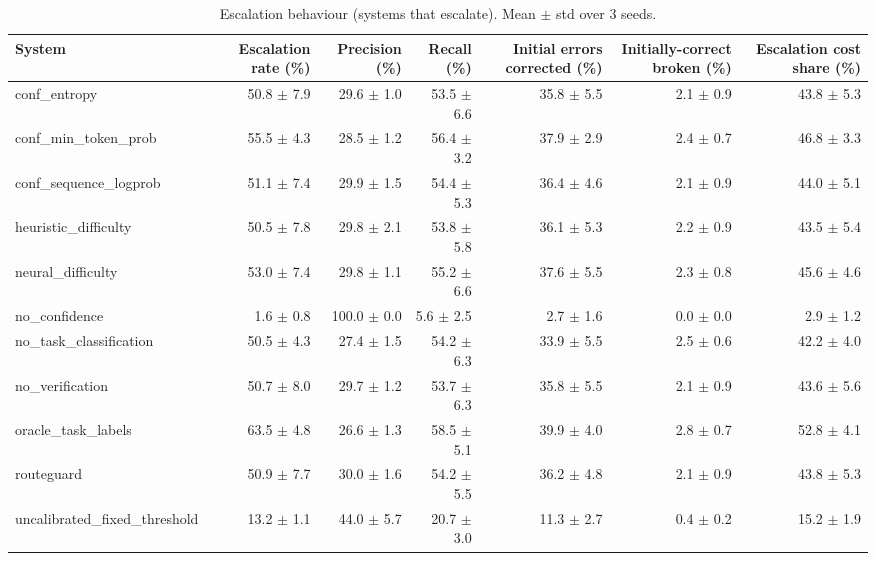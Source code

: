 \begin{table}[t]
\centering
\small
\caption{Escalation behaviour (systems that escalate). Mean $\pm$ std over 3 seeds.}
\label{tab:escalation}
\begin{tabular}{lrrrrrr}
\toprule
System & Escalation rate (\%) & Precision (\%) & Recall (\%) & Initial errors corrected (\%) & Initially-correct broken (\%) & Escalation cost share (\%) \\
\midrule
conf\_entropy & 50.8 $\pm$ 7.9 & 29.6 $\pm$ 1.0 & 53.5 $\pm$ 6.6 & 35.8 $\pm$ 5.5 & 2.1 $\pm$ 0.9 & 43.8 $\pm$ 5.3 \\
conf\_min\_token\_prob & 55.5 $\pm$ 4.3 & 28.5 $\pm$ 1.2 & 56.4 $\pm$ 3.2 & 37.9 $\pm$ 2.9 & 2.4 $\pm$ 0.7 & 46.8 $\pm$ 3.3 \\
conf\_sequence\_logprob & 51.1 $\pm$ 7.4 & 29.9 $\pm$ 1.5 & 54.4 $\pm$ 5.3 & 36.4 $\pm$ 4.6 & 2.1 $\pm$ 0.9 & 44.0 $\pm$ 5.1 \\
heuristic\_difficulty & 50.5 $\pm$ 7.8 & 29.8 $\pm$ 2.1 & 53.8 $\pm$ 5.8 & 36.1 $\pm$ 5.3 & 2.2 $\pm$ 0.9 & 43.5 $\pm$ 5.4 \\
neural\_difficulty & 53.0 $\pm$ 7.4 & 29.8 $\pm$ 1.1 & 55.2 $\pm$ 6.6 & 37.6 $\pm$ 5.5 & 2.3 $\pm$ 0.8 & 45.6 $\pm$ 4.6 \\
no\_confidence & 1.6 $\pm$ 0.8 & 100.0 $\pm$ 0.0 & 5.6 $\pm$ 2.5 & 2.7 $\pm$ 1.6 & 0.0 $\pm$ 0.0 & 2.9 $\pm$ 1.2 \\
no\_task\_classification & 50.5 $\pm$ 4.3 & 27.4 $\pm$ 1.5 & 54.2 $\pm$ 6.3 & 33.9 $\pm$ 5.5 & 2.5 $\pm$ 0.6 & 42.2 $\pm$ 4.0 \\
no\_verification & 50.7 $\pm$ 8.0 & 29.7 $\pm$ 1.2 & 53.7 $\pm$ 6.3 & 35.8 $\pm$ 5.5 & 2.1 $\pm$ 0.9 & 43.6 $\pm$ 5.6 \\
oracle\_task\_labels & 63.5 $\pm$ 4.8 & 26.6 $\pm$ 1.3 & 58.5 $\pm$ 5.1 & 39.9 $\pm$ 4.0 & 2.8 $\pm$ 0.7 & 52.8 $\pm$ 4.1 \\
routeguard & 50.9 $\pm$ 7.7 & 30.0 $\pm$ 1.6 & 54.2 $\pm$ 5.5 & 36.2 $\pm$ 4.8 & 2.1 $\pm$ 0.9 & 43.8 $\pm$ 5.3 \\
uncalibrated\_fixed\_threshold & 13.2 $\pm$ 1.1 & 44.0 $\pm$ 5.7 & 20.7 $\pm$ 3.0 & 11.3 $\pm$ 2.7 & 0.4 $\pm$ 0.2 & 15.2 $\pm$ 1.9 \\
\bottomrule
\end{tabular}
\end{table}
